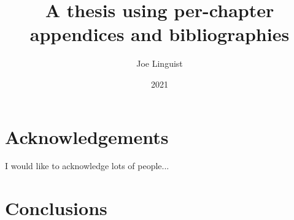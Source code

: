 \documentclass[chapterbib,chapterapp]{msu-thesis}
\title{A thesis using per-chapter appendices and bibliographies}
\author{Joe Linguist}
\date{2021}
\begin{document}
\frontmatter
\maketitlepage
\begin{abstract}
\lipsum[1]
\end{abstract}
\clearpage
\makecopyrightpage
\clearpage
\chapter*{Acknowledgements}
\DoubleSpacing %
 I would like to acknowledge lots of people...\lipsum
%
 \clearpage

\SingleSpacing
\tableofcontents* %

\clearpage
\listoftables %
\clearpage
\listoffigures %
\mainmatter





\chapter{Conclusions}
\end{document}
